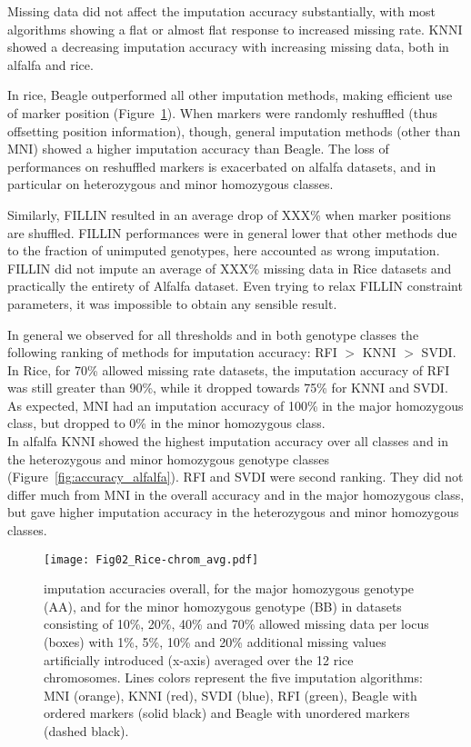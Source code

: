 Missing data did not affect the imputation accuracy substantially, with most algorithms showing a flat or almost flat response to increased missing rate. KNNI showed a decreasing imputation accuracy with increasing missing data, both in alfalfa and rice.

In rice, Beagle outperformed all other imputation methods, making efficient use of marker position (Figure~\ref{fig:accuracy_rice}). When markers were randomly reshuffled (thus offsetting position information), though, general imputation methods (other than MNI) showed a higher imputation accuracy than Beagle. The loss of performances on reshuffled markers is exacerbated on alfalfa datasets, and in particular on heterozygous and minor homozygous classes.  

Similarly, FILLIN resulted in an average drop of XXX\% when marker positions are shuffled. FILLIN performances were in general lower that other methods due to the fraction of unimputed genotypes, here accounted as wrong imputation. FILLIN did not impute an average of XXX\% missing data in Rice datasets and practically the entirety of Alfalfa dataset. Even trying to relax FILLIN constraint parameters, it was impossible to obtain any sensible result.

In general we observed for all thresholds and in both genotype classes the following ranking of methods for imputation accuracy: RFI $>$ KNNI $>$ SVDI.
In Rice, for 70\% allowed missing rate datasets, the imputation accuracy of RFI was still greater than 90\%, while it dropped towards 75\% for KNNI and SVDI. As expected, MNI had an imputation accuracy of 100\% in the major homozygous class, but dropped to 0\% in the minor homozygous class.\\
In alfalfa KNNI showed the highest imputation accuracy over all classes and in the heterozygous and minor homozygous genotype classes (Figure~\ref{fig:accuracy_alfalfa}). RFI and SVDI were second ranking. They did not differ much from MNI in the overall accuracy and in the major homozygous class, but gave higher imputation accuracy in the heterozygous and minor homozygous classes. 


\begin{figure}
\texttt{[image: Fig02\_Rice-chrom\_avg.pdf]}
\caption[Rice imputation accuracies]{
imputation accuracies overall, for the major homozygous genotype (AA), and for the minor homozygous genotype (BB) in datasets consisting of 10\%, 20\%, 40\% and 70\% allowed missing data per locus (boxes) with 1\%, 5\%, 10\% and 20\% additional missing values artificially introduced (x-axis) averaged over the 12 rice chromosomes. Lines colors represent the five imputation algorithms: MNI (orange), KNNI (red), SVDI (blue), RFI (green), Beagle with ordered markers (solid black) and Beagle with unordered markers (dashed black).}
\label{fig:accuracy_rice}
\end{figure}

